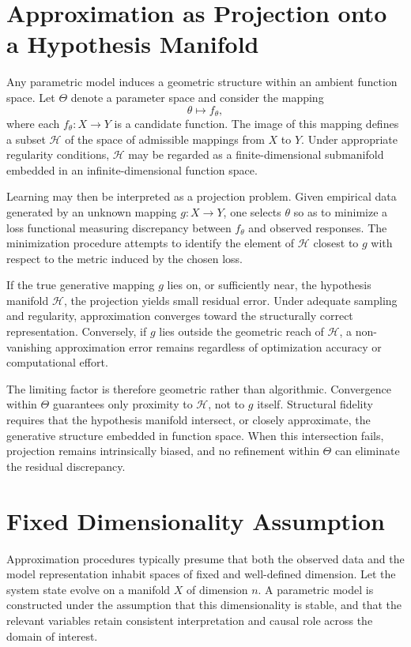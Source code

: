 \documentclass[12pt]{book}
\begin{document}
\section{Approximation as Projection onto a Hypothesis Manifold}

Any parametric model induces a geometric structure within an ambient function space. Let $\Theta$ denote a parameter space and consider the mapping
\[
\theta \mapsto f_\theta,
\]
where each $f_\theta : X \to Y$ is a candidate function. The image of this mapping defines a subset $\mathcal{H}$ of the space of admissible mappings from $X$ to $Y$. Under appropriate regularity conditions, $\mathcal{H}$ may be regarded as a finite-dimensional submanifold embedded in an infinite-dimensional function space.

Learning may then be interpreted as a projection problem. Given empirical data generated by an unknown mapping $g : X \to Y$, one selects $\theta$ so as to minimize a loss functional measuring discrepancy between $f_\theta$ and observed responses. The minimization procedure attempts to identify the element of $\mathcal{H}$ closest to $g$ with respect to the metric induced by the chosen loss.

If the true generative mapping $g$ lies on, or sufficiently near, the hypothesis manifold $\mathcal{H}$, the projection yields small residual error. Under adequate sampling and regularity, approximation converges toward the structurally correct representation. Conversely, if $g$ lies outside the geometric reach of $\mathcal{H}$, a non-vanishing approximation error remains regardless of optimization accuracy or computational effort.

The limiting factor is therefore geometric rather than algorithmic. Convergence within $\Theta$ guarantees only proximity to $\mathcal{H}$, not to $g$ itself. Structural fidelity requires that the hypothesis manifold intersect, or closely approximate, the generative structure embedded in function space. When this intersection fails, projection remains intrinsically biased, and no refinement within $\Theta$ can eliminate the residual discrepancy.

\section{Fixed Dimensionality Assumption}

Approximation procedures typically presume that both the observed data and the model representation inhabit spaces of fixed and well-defined dimension. Let the system state evolve on a manifold $X$ of dimension $n$. A parametric model is constructed under the assumption that this dimensionality is stable, and that the relevant variables retain consistent interpretation and causal role across the domain of interest.
\end{document}
